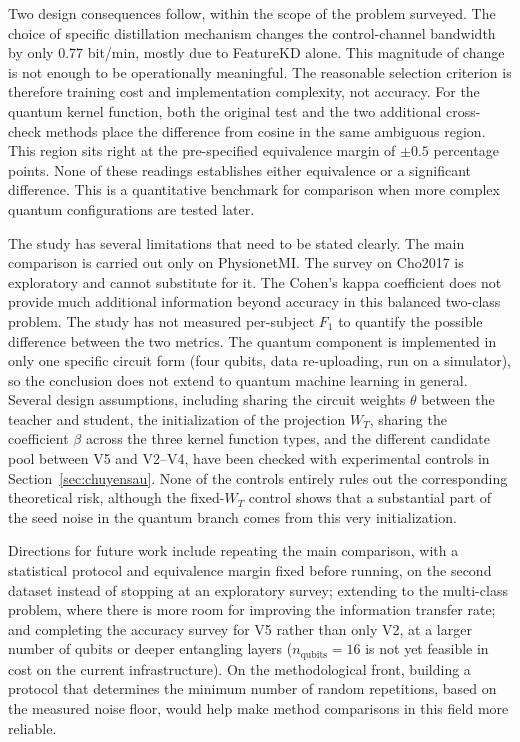 Two design consequences follow, within the scope of the problem
surveyed. The choice of specific distillation mechanism changes the
control-channel bandwidth by only 0.77 bit/min, mostly due to
FeatureKD alone. This magnitude of change is not enough to be
operationally meaningful. The reasonable selection criterion is
therefore training cost and implementation complexity, not accuracy.
For the quantum kernel function, both the original test and the two
additional cross-check methods place the difference from cosine in
the same ambiguous region. This region sits right at the
pre-specified equivalence margin of $\pm 0.5$ percentage points.
None of these readings establishes either equivalence or a
significant difference. This is a quantitative benchmark for
comparison when more complex quantum configurations are tested
later.

The study has several limitations that need to be stated clearly.
The main comparison is carried out only on PhysionetMI. The survey
on Cho2017 is exploratory and cannot substitute for it. The Cohen's
kappa coefficient does not provide much additional information
beyond accuracy in this balanced two-class problem. The study has
not measured per-subject $F_1$ to quantify the possible difference
between the two metrics. The quantum component is implemented in
only one specific circuit form (four qubits, data re-uploading, run
on a simulator), so the conclusion does not extend to quantum
machine learning in general. Several design assumptions, including
sharing the circuit weights $\theta$ between the teacher and
student, the initialization of the projection $W_T$, sharing the
coefficient $\beta$ across the three kernel function types, and the
different candidate pool between V5 and V2--V4, have been checked
with experimental controls in Section~\ref{sec:chuyensau}. None of
the controls entirely rules out the corresponding theoretical risk,
although the fixed-$W_T$ control shows that a substantial part of
the seed noise in the quantum branch comes from this very
initialization.

Directions for future work include repeating the main comparison,
with a statistical protocol and equivalence margin fixed before
running, on the second dataset instead of stopping at an exploratory
survey; extending to the multi-class problem, where there is more
room for improving the information transfer rate; and completing
the accuracy survey for V5 rather than only V2, at a larger number
of qubits or deeper entangling layers ($n_{\text{qubits}}=16$ is not
yet feasible in cost on the current infrastructure). On the
methodological front, building a protocol that determines the
minimum number of random repetitions, based on the measured noise
floor, would help make method comparisons in this field more
reliable.

